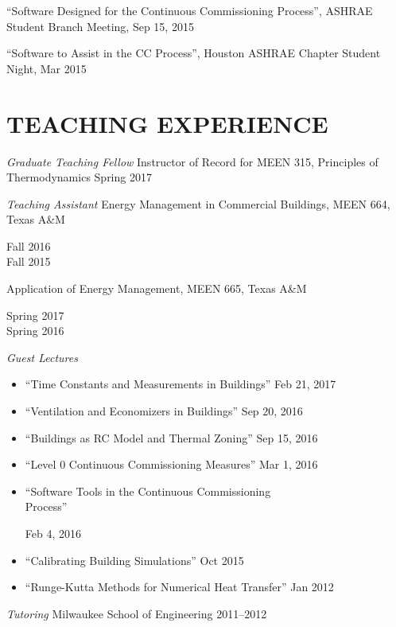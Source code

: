 \documentclass[margin]{res} %
\begin{document}
\begin{resume}
``Software Designed for the Continuous Commissioning Process'', ASHRAE Student Branch Meeting, Sep 15, 2015

``Software to Assist in the CC Process'', Houston ASHRAE Chapter Student Night, Mar 2015


\section{TEACHING EXPERIENCE}
{\sl Graduate Teaching Fellow }\newline
Instructor of Record for MEEN 315, Principles of Thermodynamics \hfill Spring 2017

{\sl Teaching Assistant}\newline
Energy Management in Commercial Buildings, MEEN 664, Texas A\&M \hfill \parbox[t]{1.5cm}{\raggedleft Fall 2016 \\ Fall 2015} \par

\vspace{10pt}

Application of Energy Management, MEEN 665, Texas A\&M \hfill \parbox[t]{2cm}{\raggedleft Spring 2017 \\ Spring 2016}

\vspace{10pt}
{\sl Guest Lectures}
\begin{itemize}
    \item ``Time Constants and Measurements in Buildings'' \hfill Feb 21, 2017
    \item ``Ventilation and Economizers in Buildings'' \hfill Sep 20, 2016
    \item ``Buildings as RC Model and Thermal Zoning'' \hfill Sep 15, 2016
    \item ``Level 0 Continuous Commissioning Measures'' \hfill Mar 1, 2016
    \item  \parbox{10cm}{``Software Tools in the Continuous Commissioning \\ Process''} \hfill Feb 4, 2016
    \item ``Calibrating Building Simulations'' \hfill Oct 2015
    \item ``Runge-Kutta Methods for Numerical Heat Transfer'' \hfill Jan 2012
\end{itemize}

\medskip


{\sl Tutoring} \newline
Milwaukee School of Engineering \hfill 2011--2012


\end{resume}
\end{document}

